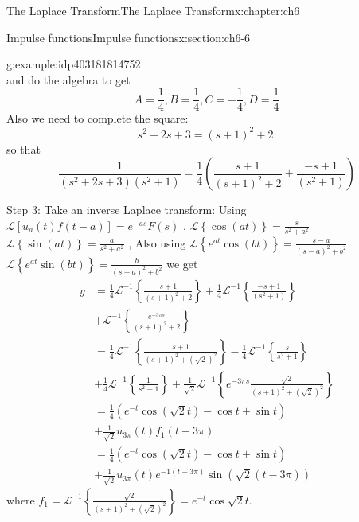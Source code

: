 \documentclass[oneside,10pt,]{book}
\numberwithin{equation}{section}
\numberwithin{equation}{section}
\newcommand{\amp}{&}
\begin{document}
\begin{chapterptx}{The Laplace Transform}{}{The Laplace Transform}{}{}{x:chapter:ch6}
\begin{sectionptx}{Impulse functions}{}{Impulse functions}{}{}{x:section:ch6-6}
\begin{example}{}{g:example:idp403181814752}
\begin{equation*}
\end{equation*}
and do the algebra to get%
\begin{equation*}
A=\frac{1}{4},B=\frac{1}{4},C=-\frac{1}{4},D=\frac{1}{4}
\end{equation*}
Also we need to complete the square:%
\begin{equation*}
s^{2}+2s+3=\left(s+1\right)^{2}+2.
\end{equation*}
so that%
\begin{equation*}
\frac{1}{\left(s^{2}+2s+3\right)\left(s^{2}+1\right)}=\frac{1}{4}\left(\frac{s+1}{\left(s+1\right)^{2}+2}+\frac{-s+1}{\left(s^{2}+1\right)}\right)
\end{equation*}
%
\par
Step 3: Take an inverse Laplace transform: Using \(\mathcal{L}\left[u_{a}(t)f(t-a)\right]=e^{-as}F(s)\) , \(\mathcal{L}\left\{ \cos(at)\right\} =\frac{s}{s^{2}+a^{2}}\) \(\mathcal{L}\left\{ \sin(at)\right\} =\frac{a}{s^{2}+a^{2}}\) , Also using \(\mathcal{L}\left\{ e^{at}\cos(bt)\right\} =\frac{s-a}{(s-a)^{2}+b^{2}}\) \(\mathcal{L}\left\{ e^{at}\sin(bt)\right\} =\frac{b}{(s-a)^{2}+b^{2}}\) we get%
\begin{align*}
y \amp =\frac{1}{4}\mathcal{L}^{-1}\left\{ \frac{s+1}{\left(s+1\right)^{2}+2}\right\} +\frac{1}{4}\mathcal{L}^{-1}\left\{ \frac{-s+1}{\left(s^{2}+1\right)}\right\} \\
\amp +\mathcal{L}^{-1}\left\{ \frac{e^{-3\pi s}}{\left(s+1\right)^{2}+2}\right\} \\
\amp =\frac{1}{4}\mathcal{L}^{-1}\left\{ \frac{s+1}{\left(s+1\right)^{2}+\left(\sqrt{2}\right)^{2}}\right\} -\frac{1}{4}\mathcal{L}^{-1}\left\{ \frac{s}{s^{2}+1}\right\} \\
\amp +\frac{1}{4}\mathcal{L}^{-1}\left\{ \frac{1}{s^{2}+1}\right\} +\frac{1}{\sqrt{2}}\mathcal{L}^{-1}\left\{ e^{-3\pi s}\frac{\sqrt{2}}{\left(s+1\right)^{2}+\left(\sqrt{2}\right)^{2}}\right\} \\
\amp =\frac{1}{4}\left(e^{-t}\cos\left(\sqrt{2}t\right)-\cos t+\sin t\right)\\
\amp +\frac{1}{\sqrt{2}}u_{3\pi}\left(t\right)f_{1}\left(t-3\pi\right)\\
\amp =\frac{1}{4}\left(e^{-t}\cos\left(\sqrt{2}t\right)-\cos t+\sin t\right)\\
\amp +\frac{1}{\sqrt{2}}u_{3\pi}\left(t\right)e^{-1\left(t-3\pi\right)}\sin\left(\sqrt{2}\left(t-3\pi\right)\right)
\end{align*}
where \(f_{1}=\mathcal{L}^{-1}\left\{ \frac{\sqrt{2}}{\left(s+1\right)^{2}+\left(\sqrt{2}\right)^{2}}\right\} =e^{-t}\cos\sqrt{2}t\).%

\end{example}
\end{sectionptx}
\end{chapterptx}
\end{document}
